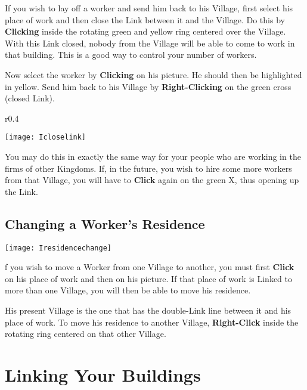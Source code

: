 If you wish to lay off a worker and send him back to his Village, first select his place of work and then close the Link between it and the Village. Do this by \textbf{Clicking} inside the rotating green and yellow ring centered over the Village. With this Link closed, nobody from the Village will be able to come to work in that building. This is a good way to control your number of workers.

Now select the worker by \textbf{Clicking} on his picture. He should then be highlighted in yellow. Send him back to his Village by \textbf{Right-Clicking} on the green cross (closed Link).

\begin{wrapfigure}{r}{0.4\textwidth}
	\vspace{-20pt}
	\begin{center}
		\texttt{[image: Icloselink]} %
	\end{center}
	\vspace{-10pt}
\end{wrapfigure}

You may do this in exactly the same way for your people who are working in the firms of other Kingdoms. If, in the future, you wish to hire some more workers from that Village, you will have to \textbf{Click} again on the green X, thus opening up the Link.

\subsection{\textsf{Changing a Worker’s Residence}}


\begin{center}
    \texttt{[image: Iresidencechange]} %
\end{center}

f you wish to move a Worker from one Village to another, you must first \textbf{Click} on his place of work and then on his picture. If that place of work is Linked to more than one Village, you will then be able to move his residence.

His present Village is the one that has the double-Link line between it and his place of work. To move his residence to another Village, \textbf{Right-Click} inside the rotating ring centered on that other Village.

\section{\textsf{Linking Your Buildings}}

